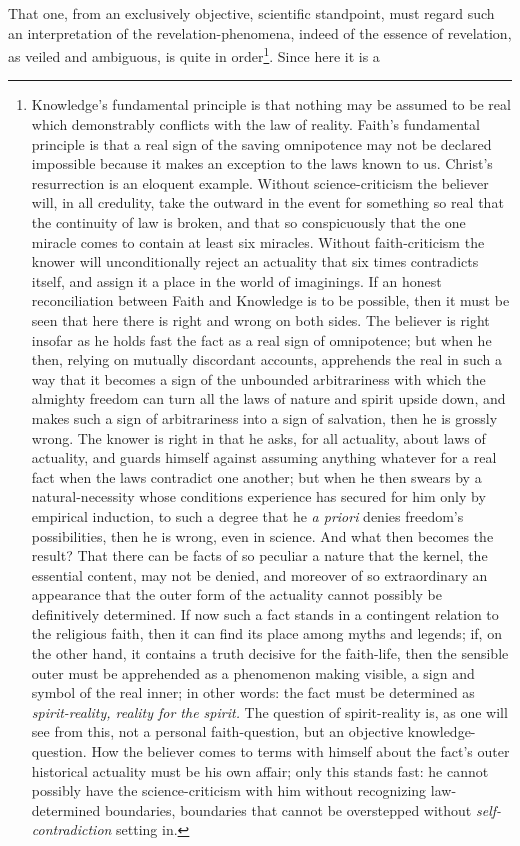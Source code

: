 \documentclass[12pt]{article}
\begin{document}
That one, from an exclusively objective, scientific standpoint, must regard
such an interpretation of the revelation-phenomena, indeed of the essence of
revelation, as veiled and ambiguous, is quite in order\footnote{Knowledge's
fundamental principle is that nothing may be assumed to be real which
demonstrably conflicts with the law of reality. Faith's fundamental principle
is that a real sign of the saving omnipotence may not be declared impossible
because it makes an exception to the laws known to us. Christ's resurrection is
an eloquent example. Without science-criticism the believer will, in all
credulity, take the outward in the event for something so real that the
continuity of law is broken, and that so conspicuously that the one miracle
comes to contain at least six miracles. Without faith-criticism the knower will
unconditionally reject an actuality that six times contradicts itself, and
assign it a place in the world of imaginings. If an honest reconciliation
between Faith and Knowledge is to be possible, then it must be seen that here
there is right and wrong on both sides. The believer is right insofar as he
holds fast the fact as a real sign of omnipotence; but when he then, relying on
mutually discordant accounts, apprehends the real in such a way that it becomes
a sign of the unbounded arbitrariness with which the almighty freedom can turn
all the laws of nature and spirit upside down, and makes such a sign of
arbitrariness into a sign of salvation, then he is grossly wrong. The knower is
right in that he asks, for all actuality, about laws of actuality, and guards
himself against assuming anything whatever for a real fact when the laws
contradict one another; but when he then swears by a natural-necessity whose
conditions experience has secured for him only by empirical induction, to such
a degree that he \textit{a priori} denies freedom's possibilities, then he is
wrong, even in science. And what
then becomes the result? That there can be facts of so peculiar a nature that
the kernel, the essential content, may not be denied, and moreover of so
extraordinary an appearance that the outer form of the actuality cannot
possibly be definitively determined. If now such a fact stands in a contingent
relation to the religious faith, then it can find its place among myths and
legends; if, on the other hand, it contains a truth decisive for the
faith-life, then the sensible outer must be apprehended as a phenomenon making
visible, a sign and symbol of the real inner; in other words: the fact must be
determined as \emph{spirit-reality, reality for the spirit.} The question of
spirit-reality is, as one will see from this, not a personal faith-question,
but an objective knowledge-question. How the believer comes to terms with
himself about the fact's outer historical actuality must be his own affair;
only this stands fast: he cannot possibly have the science-criticism with him
without recognizing law-determined boundaries, boundaries that cannot be
overstepped without \emph{self-contradiction} setting in.}. Since here it is a
\end{document}
